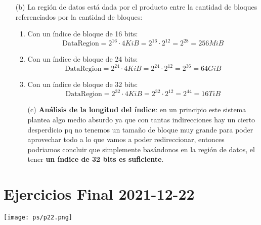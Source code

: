 \documentclass[openany]{book}
\begin{document}
\begin{rta}
\begin{itemize}
\begin{enumerate}
        \end{enumerate} 
        \item[(b)] La región de datos está dada por el producto entre la cantidad de bloques referenciados por la cantidad de bloques:
        \begin{enumerate}
            \item Con un índice de bloque de 16 bits:
            \begin{equation*}
                \text{DataRegion} = 2^{16} \cdot 4KiB = 2^{16} \cdot 2^{12} = 2^{28} = 256MiB
            \end{equation*}
            \item Con un índice de bloque de 24 bits:
            \begin{equation*}
                \text{DataRegion} = 2^{24} \cdot 4KiB = 2^{24} \cdot 2^{12} = 2^{36} = 64GiB
            \end{equation*}
            \item Con un índice de bloque de 32 bits:
            \begin{equation*}
                \text{DataRegion} = 2^{32} \cdot 4KiB = 2^{32} \cdot 2^{12} = 2^{44} = 16TiB
            \end{equation*}
            \item[(c)] \textbf{Análisis de la longitud del índice}: en un principio este sistema plantea algo medio absurdo ya que con tantas indirecciones hay un cierto desperdicio pq no tenemos un tamaño de bloque muy grande para poder aprovechar todo a lo que vamos a poder redireccionar, entonces podriamos concluir que simplemente basándonos en la región de datos, el tener \textbf{un índice de 32 bits es suficiente}.
        \end{enumerate} 
    \end{itemize}
\end{rta}

\section*{Ejercicios Final 2021-12-22}
\texttt{[image: ps/p22.png]}
\end{document}
